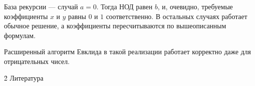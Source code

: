 База рекурсии --- случай $a = 0$. Тогда НОД равен $b$, и, очевидно, требуемые коэффициенты $x$ и $y$ равны $0$ и $1$ соответственно. В остальных случаях работает обычное решение, а коэффициенты пересчитываются по вышеописанным формулам.

Расширенный алгоритм Евклида в такой реализации работает корректно даже для отрицательных чисел.


\h2{ Литература }

\ul{
\li {}
}